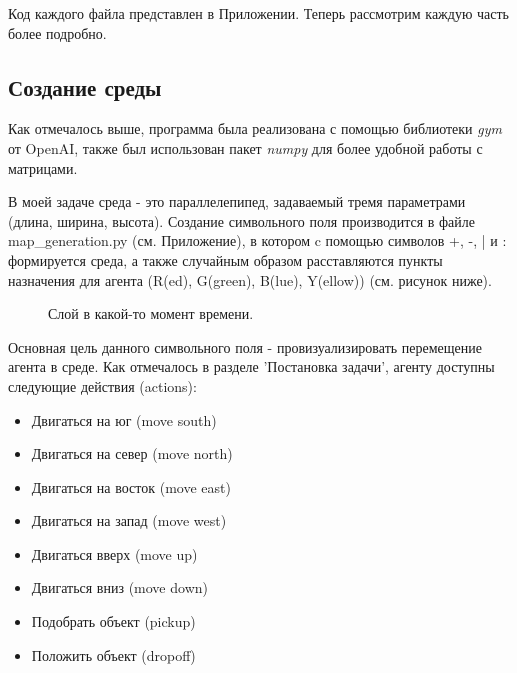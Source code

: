 \documentclass[a4paper]{report}
\theoremstyle{definition}
\theoremstyle{plain}
\theoremstyle{remark}
\theoremstyle{remark}
\theoremstyle{definition}
\begin{document}
Код каждого файла представлен в Приложении.
Теперь рассмотрим каждую часть более подробно.
\begin{center}
    \subsection{Создание среды}
\end{center}

Как отмечалось выше, программа была реализована с помощью библиотеки \textit{gym} от OpenAI, также был использован пакет \textit{numpy} для более удобной работы с матрицами.

В моей задаче среда - это параллелепипед, задаваемый тремя параметрами (длина, ширина, высота). Создание символьного поля производится в файле map\_generation.py (см. Приложение), в котором c помощью символов +, -, | и : формируется среда, а также случайным образом расставляются пункты назначения для агента (R(ed), G(green), B(lue), Y(ellow)) (см. рисунок ниже).
\begin{figure}[H]
	\caption{Слой в какой-то момент времени.}
\end{figure}

Основная цель данного символьного поля - провизуализировать перемещение агента в среде. Как отмечалось в разделе 'Постановка задачи', агенту доступны следующие действия (actions):
\begin{itemize}
\item Двигаться на юг (move south)
\item Двигаться на север (move north)
\item Двигаться на восток (move east)
\item Двигаться на запад (move west)
\item Двигаться вверх (move up)
\item Двигаться вниз (move down)
\item Подобрать объект (pickup)
\item Положить объект (dropoff)
 \end{itemize}
\end{document}
